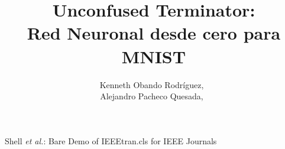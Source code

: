 \documentclass[journal]{IEEEtran}
\begin{document}
%
\title{Unconfused Terminator:\\ Red Neuronal desde cero para MNIST}
%
%
%

\author{Kenneth Obando Rodríguez,~\\
        Alejandro Pacheco Quesada,~}

% 
%



%
{Shell \MakeLowercase{\textit{et al.}}: Bare Demo of IEEEtran.cls for IEEE Journals}
% 
\end{document}
